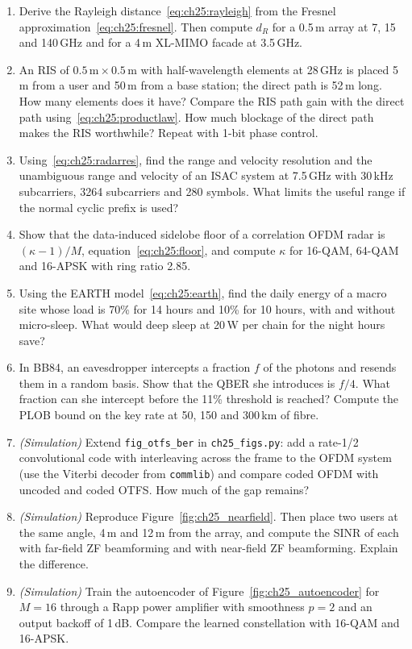 \begin{enumerate}[label=\thechapter.\arabic*]
\item Derive the Rayleigh distance~\eqref{eq:ch25:rayleigh} from the Fresnel
approximation~\eqref{eq:ch25:fresnel}. Then compute $d_R$ for a 0.5\,m array at 7, 15 and 140\,GHz and
for a 4\,m XL-MIMO facade at 3.5\,GHz.
\item An RIS of $0.5\,\text{m}\times0.5\,\text{m}$ with half-wavelength elements at 28\,GHz is placed 5\,m
from a user and 50\,m from a base station; the direct path is 52\,m long. How many elements does it
have? Compare the RIS path gain with the direct path using~\eqref{eq:ch25:productlaw}. How much blockage
of the direct path makes the RIS worthwhile? Repeat with 1-bit phase control.
\item Using~\eqref{eq:ch25:radarres}, find the range and velocity resolution and the unambiguous
range and velocity of an ISAC system at 7.5\,GHz with 30\,kHz subcarriers, 3264 subcarriers and 280
symbols. What limits the useful range if the normal cyclic prefix is used?
\item Show that the data-induced sidelobe floor of a correlation OFDM radar is $(\kappa-1)/M$,
equation~\eqref{eq:ch25:floor}, and compute $\kappa$ for 16-QAM, 64-QAM and 16-APSK with ring ratio 2.85.
\item Using the EARTH model~\eqref{eq:ch25:earth}, find the daily energy of a macro site whose load is
70\% for 14 hours and 10\% for 10 hours, with and without micro-sleep. What would deep sleep at 20\,W per
chain for the night hours save?
\item In BB84, an eavesdropper intercepts a fraction $f$ of the photons and resends them in a random
basis. Show that the QBER she introduces is $f/4$. What fraction can she intercept before the 11\%
threshold is reached? Compute the PLOB bound on the key rate at 50, 150 and 300\,km of fibre.
\item \emph{(Simulation)} Extend \texttt{fig\_otfs\_ber} in \texttt{ch25\_figs.py}: add a rate-1/2
convolutional code with interleaving across the frame to the OFDM system (use the Viterbi decoder from
\texttt{commlib}) and compare coded OFDM with uncoded and coded OTFS. How much of the gap remains?
\item \emph{(Simulation)} Reproduce Figure~\ref{fig:ch25_nearfield}. Then place two users at the same
angle, 4\,m and 12\,m from the array, and compute the SINR of each with far-field ZF beamforming and
with near-field ZF beamforming. Explain the difference.
\item \emph{(Simulation)} Train the autoencoder of Figure~\ref{fig:ch25_autoencoder} for $M=16$ through
a Rapp power amplifier with smoothness $p=2$ and an output backoff of 1\,dB. Compare the learned
constellation with 16-QAM and 16-APSK.
\end{enumerate}

